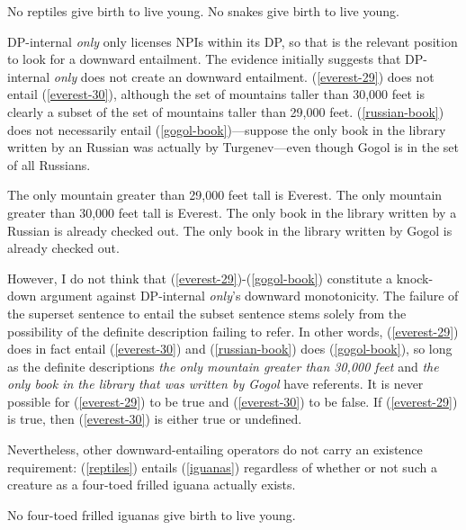 \documentclass{article}
\begin{document}
\begin{exe}
	\ex \label{reptiles} No reptiles give birth to live young.
	\ex \label{snakes} No snakes give birth to live young.
\end{exe}

DP-internal \textit{only} only licenses NPIs within its DP, so that is the relevant position to look for a downward entailment. The evidence initially suggests that DP-internal \textit{only} does not create an downward entailment. (\ref{everest-29}) does not entail (\ref{everest-30}), although the set of mountains taller than 30,000 feet is clearly a subset of the set of mountains taller than 29,000 feet. (\ref{russian-book}) does not necessarily entail (\ref{gogol-book})---suppose the only book in the library written by an Russian was actually by Turgenev---even though Gogol is in the set of all Russians.

\begin{exe}
	\ex \label{everest-29} The only mountain greater than 29,000 feet tall is Everest.
	\ex \label{everest-30} The only mountain greater than 30,000 feet tall is Everest.
	\ex \label{russian-book} The only book in the library written by a Russian is already checked out.
	\ex \label{gogol-book} The only book in the library written by Gogol is already checked out.
\end{exe}

However, I do not think that (\ref{everest-29})-(\ref{gogol-book}) constitute a knock-down argument against DP-internal \textit{only}'s downward monotonicity. The failure of the superset sentence to entail the subset sentence stems solely from the possibility of the definite description failing to refer. In other words, (\ref{everest-29}) does in fact entail (\ref{everest-30}) and (\ref{russian-book}) does (\ref{gogol-book}), so long as the definite descriptions \textit{the only mountain greater than 30,000 feet} and \textit{the only book in the library that was written by Gogol} have referents. It is never possible for (\ref{everest-29}) to be true and (\ref{everest-30}) to be false. If (\ref{everest-29}) is true, then (\ref{everest-30}) is either true or undefined.

Nevertheless, other downward-entailing operators do not carry an existence requirement: (\ref{reptiles}) entails (\ref{iguanas}) regardless of whether or not such a creature as a four-toed frilled iguana actually exists.

\begin{exe}
	\ex \label{iguanas} No four-toed frilled iguanas give birth to live young.
\end{exe}
\end{document}

